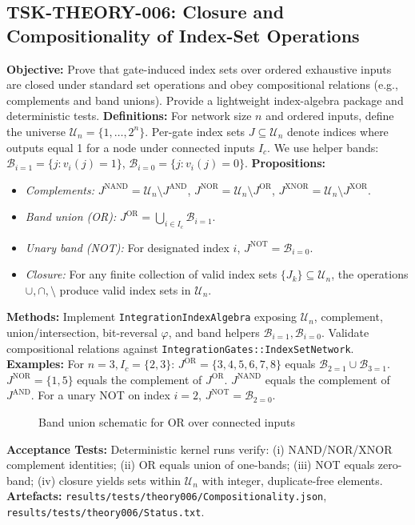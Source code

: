 \documentclass[11pt]{article}
\begin{document}
\subsection{TSK-THEORY-006: Closure and Compositionality of Index-Set Operations}
\textbf{Objective:} Prove that gate-induced index sets over ordered exhaustive inputs are closed under standard set operations and obey compositional relations (e.g., complements and band unions). Provide a lightweight index-algebra package and deterministic tests.
\textbf{Definitions:} For network size \(n\) and ordered inputs, define the universe \(\mathcal{U}_n=\{1,\dots,2^n\}\). Per-gate index sets \(J\subseteq\mathcal{U}_n\) denote indices where outputs equal 1 for a node under connected inputs \(I_c\). We use helper bands: \(\mathcal{B}_{i=1}=\{ j: v_i(j)=1\}\), \(\mathcal{B}_{i=0}=\{ j: v_i(j)=0\}\).
\textbf{Propositions:}
\begin{itemize}
 \item \emph{Complements:} \(J^{\mathrm{NAND}} = \mathcal{U}_n \setminus J^{\mathrm{AND}}\), \(J^{\mathrm{NOR}} = \mathcal{U}_n \setminus J^{\mathrm{OR}}\), \(J^{\mathrm{XNOR}} = \mathcal{U}_n \setminus J^{\mathrm{XOR}}\).
 \item \emph{Band union (OR):} \(J^{\mathrm{OR}} = \bigcup_{i\in I_c} \mathcal{B}_{i=1}\).
 \item \emph{Unary band (NOT):} For designated index \(i\), \(J^{\mathrm{NOT}} = \mathcal{B}_{i=0}\).
 \item \emph{Closure:} For any finite collection of valid index sets \(\{J_k\}\subseteq\mathcal{U}_n\), the operations \(\cup,\cap,\setminus\) produce valid index sets in \(\mathcal{U}_n\).
\end{itemize}
\textbf{Methods:} Implement \texttt{Integration\textasciigrave IndexAlgebra} exposing \(\mathcal{U}_n\), complement, union/intersection, bit-reversal \(\varphi\), and band helpers \(\mathcal{B}_{i=1}, \mathcal{B}_{i=0}\). Validate compositional relations against \texttt{Integration\textasciigrave Gates::IndexSetNetwork}.
\textbf{Examples:} For \(n=3, I_c=\{2,3\}\): \(J^{\mathrm{OR}}=\{3,4,5,6,7,8\}\) equals \(\mathcal{B}_{2=1}\cup\mathcal{B}_{3=1}\). \(J^{\mathrm{NOR}}=\{1,5\}\) equals the complement of \(J^{\mathrm{OR}}\). \(J^{\mathrm{NAND}}\) equals the complement of \(J^{\mathrm{AND}}\). For a unary NOT on index \(i=2\), \(J^{\mathrm{NOT}}=\mathcal{B}_{2=0}\).
\begin{figure}[h]
\centering
{}
\caption{Band union schematic for OR over connected inputs}
\end{figure}
\textbf{Acceptance Tests:} Deterministic kernel runs verify: (i) NAND/NOR/XNOR complement identities; (ii) OR equals union of one-bands; (iii) NOT equals zero-band; (iv) closure yields sets within \(\mathcal{U}_n\) with integer, duplicate-free elements.
\textbf{Artefacts:} \texttt{results/tests/theory006/Compositionality.json}, \texttt{results/tests/theory006/Status.txt}.
\end{document}
